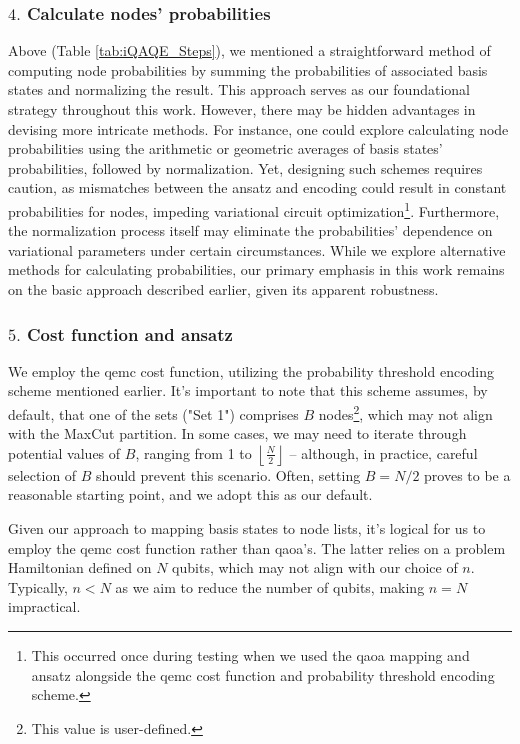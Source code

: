 \subsubsection*{$4.$ Calculate nodes' probabilities}
Above (Table \ref{tab:iQAQE_Steps}), we mentioned a straightforward method of computing node probabilities by summing the probabilities of associated basis states and normalizing the result. This approach serves as our foundational strategy throughout this work. However, there may be hidden advantages in devising more intricate methods. For instance, one could explore calculating node probabilities using the arithmetic or geometric averages of basis states' probabilities, followed by normalization. Yet, designing such schemes requires caution, as mismatches between the ansatz and encoding could result in constant probabilities for nodes, impeding variational circuit optimization\footnote{This occurred once during testing when we used the \acrshort{qaoa} mapping and ansatz alongside the \acrshort{qemc} cost function and probability threshold encoding scheme.}. Furthermore, the normalization process itself may eliminate the probabilities' dependence on variational parameters under certain circumstances. While we explore alternative methods for calculating probabilities, our primary emphasis in this work remains on the basic approach described earlier, given its apparent robustness.

\subsubsection*{$5.$ Cost function and ansatz}
We employ the \acrshort{qemc} cost function, utilizing the probability threshold encoding scheme mentioned earlier. It's important to note that this scheme assumes, by default, that one of the sets ("Set 1") comprises $B$ nodes\footnote{This value is user-defined.}, which may not align with the MaxCut partition. In some cases, we may need to iterate through potential values of $B$, ranging from 1 to $\left\lfloor{\frac{N}{2}}\right\rfloor$ – although, in practice, careful selection of $B$ should prevent this scenario. Often, setting $B = N/2$ proves to be a reasonable starting point, and we adopt this as our default.

Given our approach to mapping basis states to node lists, it's logical for us to employ the \acrshort{qemc} cost function rather than \acrshort{qaoa}'s. The latter relies on a problem Hamiltonian defined on $N$ qubits, which may not align with our choice of $n$. Typically, $n < N$ as we aim to reduce the number of qubits, making $n = N$ impractical.

